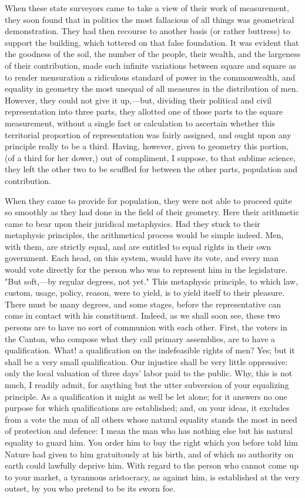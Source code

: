When these state surveyors came to take a view of their work of measurement, they soon found that in politics the most fallacious of all things was geometrical demonstration. They had then recourse to another basis (or rather buttress) to support the building, which tottered on that false foundation. It was evident that the goodness of the soil, the number of the people, their wealth, and the largeness of their contribution, made such infinite variations between square and square as to render mensuration a ridiculous standard of power in the commonwealth, and equality in geometry the most unequal of all measures in the distribution of men. However, they could not give it up,—but, dividing their political and civil representation into three parts, they allotted one of those parts to the square measurement, without a single fact or calculation to ascertain whether this territorial proportion of representation was fairly assigned, and ought upon any principle really to be a third. Having, however, given to geometry this portion, (of a third for her dower,) out of compliment, I suppose, to that sublime science, they left the other two to be scuffled for between the other parts, population and contribution.

When they came to provide for population, they were not able to proceed quite so smoothly as they had done in the field of their geometry. Here their arithmetic came to bear upon their juridical metaphysics. Had they stuck to their metaphysic principles, the arithmetical process would be simple indeed. Men, with them, are strictly equal, and are entitled to equal rights in their own government. Each head, on this system, would have its vote, and every man would vote directly for the person who was to represent him in the legislature. "But soft,—by regular degrees, not yet." This metaphysic principle, to which law, custom, usage, policy, reason, were to yield, is to yield itself to their pleasure. There must be many degrees, and some stages, before the representative can come in contact with his constituent. Indeed, as we shall soon see, these two persons are to have no sort of communion with each other. First, the voters in the Canton, who compose what they call primary assemblies, are to have a qualification. What! a qualification on the indefeasible rights of men? Yes; but it shall be a very small qualification. Our injustice shall be very little oppressive: only the local valuation of three days' labor paid to the public. Why, this is not much, I readily admit, for anything but the utter subversion of your equalizing principle. As a qualification it might as well be let alone; for it answers no one purpose for which qualifications are established; and, on your ideas, it excludes from a vote the man of all others whose natural equality stands the most in need of protection and defence: I mean the man who has nothing else but his natural equality to guard him. You order him to buy the right which you before told him Nature had given to him gratuitously at his birth, and of which no authority on earth could lawfully deprive him. With regard to the person who cannot come up to your market, a tyrannous aristocracy, as against him, is established at the very outset, by you who pretend to be its sworn foe.

